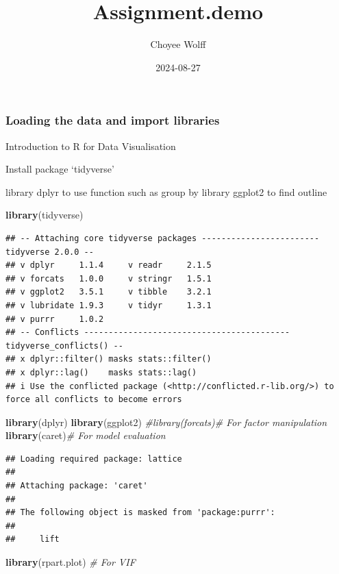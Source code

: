 \documentclass[
]{article}
\title{Assignment.demo}
\author{Choyee Wolff}
\date{2024-08-27}
\newenvironment{Shaded}{\begin{snugshade}}{\end{snugshade}}
\newcommand{\CommentTok}[1]{\textcolor[rgb]{0.56,0.35,0.01}{\textit{#1}}}
\newcommand{\FunctionTok}[1]{\textcolor[rgb]{0.13,0.29,0.53}{\textbf{#1}}}
\newcommand{\NormalTok}[1]{#1}
\begin{document}
\maketitle

\subsubsection{Loading the data and import
libraries}\label{loading-the-data-and-import-libraries}

Introduction to R for Data Visualisation

Install package `tidyverse'

library dplyr to use function such as group by library ggplot2 to find
outline

\begin{Shaded}
\begin{Highlighting}[]
\FunctionTok{library}\NormalTok{(tidyverse)}
\end{Highlighting}
\end{Shaded}

\begin{verbatim}
## -- Attaching core tidyverse packages ------------------------ tidyverse 2.0.0 --
## v dplyr     1.1.4     v readr     2.1.5
## v forcats   1.0.0     v stringr   1.5.1
## v ggplot2   3.5.1     v tibble    3.2.1
## v lubridate 1.9.3     v tidyr     1.3.1
## v purrr     1.0.2     
## -- Conflicts ------------------------------------------ tidyverse_conflicts() --
## x dplyr::filter() masks stats::filter()
## x dplyr::lag()    masks stats::lag()
## i Use the conflicted package (<http://conflicted.r-lib.org/>) to force all conflicts to become errors
\end{verbatim}

\begin{Shaded}
\begin{Highlighting}[]
\FunctionTok{library}\NormalTok{(dplyr) }
\FunctionTok{library}\NormalTok{(ggplot2)}
\CommentTok{\#library(forcats)\# For factor manipulation}
\FunctionTok{library}\NormalTok{(caret)}\CommentTok{\# For model evaluation}
\end{Highlighting}
\end{Shaded}

\begin{verbatim}
## Loading required package: lattice
## 
## Attaching package: 'caret'
## 
## The following object is masked from 'package:purrr':
## 
##     lift
\end{verbatim}

\begin{Shaded}
\begin{Highlighting}[]
\FunctionTok{library}\NormalTok{(rpart.plot) }\CommentTok{\# For VIF}
\end{Highlighting}
\end{Shaded}
\end{document}
